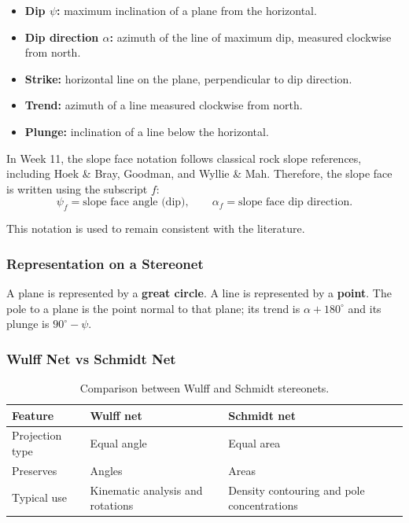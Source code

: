 \documentclass[a4paper,12pt]{article}
\begin{document}
\begin{itemize}[nosep]
    \item \textbf{Dip $\psi$:} maximum inclination of a plane from the horizontal.
    \item \textbf{Dip direction $\alpha$:} azimuth of the line of maximum dip, measured clockwise from north.
    \item \textbf{Strike:} horizontal line on the plane, perpendicular to dip direction.
    \item \textbf{Trend:} azimuth of a line measured clockwise from north.
    \item \textbf{Plunge:} inclination of a line below the horizontal.
\end{itemize}

\begin{notebox}
In Week 11, the slope face notation follows classical rock slope references, including Hoek \& Bray, Goodman, and Wyllie \& Mah.
\vspace{1.0 em}
Therefore, the slope face is written using the subscript $f$:
\[
\psi_f = \text{slope face angle (dip)}, \qquad
\alpha_f = \text{slope face dip direction}.
\]

This notation is used to remain consistent with the literature.
\end{notebox}

\subsubsection{Representation on a Stereonet}

A plane is represented by a \textbf{great circle}. A line is represented by a \textbf{point}. The pole to a plane is the point normal to that plane; its trend is $\alpha + 180^\circ$ and its plunge is $90^\circ - \psi$.

\subsubsection{Wulff Net vs Schmidt Net}

\begin{table}[h!]
\centering
\begin{tabularx}{\textwidth}{l X X}
\toprule
\textbf{Feature} & \textbf{Wulff net} & \textbf{Schmidt net} \\
\midrule
Projection type & Equal angle & Equal area \\
Preserves & Angles & Areas \\
Typical use & Kinematic analysis and rotations & Density contouring and pole concentrations \\
\bottomrule
\end{tabularx}
\caption{Comparison between Wulff and Schmidt stereonets.}
\end{table}
\end{document}
